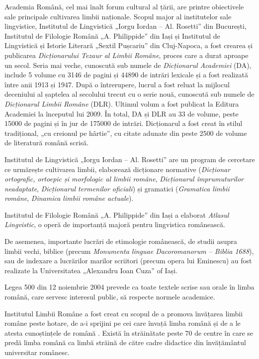 \begin{multicols}{2}
Academia Română, cel mai înalt forum cultural al țării, are printre obiectivele sale principale cultivarea limbii naționale. Scopul major al institutelor sale lingvistice, Institutul de Lingvistică „Iorgu Iordan -- Al. Rosetti” din București, Institutul de Filologie Română „A. Philippide” din Iași și Institutul de Lingvistică și Istorie Literară „Sextil Pușcariu” din Cluj-Napoca, a fost crearea și publicarea \textit{Dicționarului Tezaur al Limbii Române}, proces care a durat aproape un secol. Seria mai veche, cunoscută sub numele de \textit{Dicționarul Academiei} (DA), include 5 volume cu 3146 de pagini și 44890 de intrări lexicale și a fost realizată între anii 1913 și 1947. După o întrerupere, lucrul a fost reluat la mijlocul deceniului al șaptelea al secolului trecut cu o serie nouă, cunoscută sub numele de \textit{Dicționarul Limbii Române} (DLR). Ultimul volum a fost publicat la Editura Academiei la începutul lui 2009. În total, DA și DLR au 33 de volume, peste 15000 de pagini și în jur de 175000 de intrări. Dicționarul a fost creat în stilul tradițional, „cu creionul pe hârtie”, cu citate adunate din peste 2500 de volume de literatură română scrisă.

Institutul de Lingvistică „Iorgu Iordan -- Al. Rosetti” are un program de cercetare ce urmărește cultivarea limbii, elaborează dicționare normative (\textit{Dicționar ortografic, ortoepic și morfologic al limbii române}, \textit{Dicționarul împrumuturilor neadaptate}, \textit{Dicționarul termenilor oficiali}) și gramatici (\textit{Gramatica limbii române}, \textit{Dinamica limbii române actuale}).

Institutul de Filologie Română „A. Philippide” din Iași a elaborat \textit{Atlasul Lingvistic}, o operă de importanță majoră pentru lingvistica românească.

De asemenea, importante lucrări de etimologie românească, de studii asupra limbii vechi, biblice (precum \textit{Monumenta linguae Dacoromanorum -- Biblia 1688}), sau de indexare a lucrărilor marilor scriitori (precum opera lui Eminescu) au fost realizate la Universitatea „Alexandru Ioan Cuza” of Iași. 

Legea 500 din 12 noiembrie 2004 prevede ca toate textele scrise sau orale în limba română, care servesc interesul public, să respecte normele academice.


Institutul Limbii Române a fost creat cu scopul de a promova învățarea limbii române peste hotare, de a-i sprijini pe cei care învață limba română și de a le atesta cunoștințele de română \cite{urlILR}. Există în străinătate peste 70 de centre în care se predă limba română ca limbă străină de către cadre didactice din învățământul universitar românesc.


\end{multicols}
